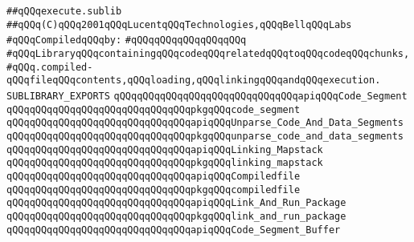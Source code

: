 \label{src/lib/compiler/execution/execute.sublib}
\verb|##qQQqexecute.sublib|\newline
\verb|##qQQq(C)qQQq2001qQQqLucentqQQqTechnologies,qQQqBellqQQqLabs|\newline
\newline
\verb|#qQQqCompiledqQQqby:|\newline
\verb|#qQQqqQQqqQQqqQQqqQQq|\newline
\newline
\newline
\newline
\verb|#qQQqLibraryqQQqcontainingqQQqcodeqQQqrelatedqQQqtoqQQqcodeqQQqchunks,|\newline
\verb|#qQQq.compiled-qQQqfileqQQqcontents,qQQqloading,qQQqlinkingqQQqandqQQqexecution.|\newline
\newline
\newline
\newline
\verb|SUBLIBRARY_EXPORTS|\newline
\newline
\verb|qQQqqQQqqQQqqQQqqQQqqQQqqQQqqQQqapiqQQqCode_Segment|\newline
\verb|qQQqqQQqqQQqqQQqqQQqqQQqqQQqqQQqpkgqQQqcode_segment|\newline
\newline
\verb|qQQqqQQqqQQqqQQqqQQqqQQqqQQqqQQqapiqQQqUnparse_Code_And_Data_Segments|\newline
\verb|qQQqqQQqqQQqqQQqqQQqqQQqqQQqqQQqpkgqQQqunparse_code_and_data_segments|\newline
\newline
\verb|qQQqqQQqqQQqqQQqqQQqqQQqqQQqqQQqapiqQQqLinking_Mapstack|\newline
\verb|qQQqqQQqqQQqqQQqqQQqqQQqqQQqqQQqpkgqQQqlinking_mapstack|\newline
\newline
\verb|qQQqqQQqqQQqqQQqqQQqqQQqqQQqqQQqapiqQQqCompiledfile|\newline
\verb|qQQqqQQqqQQqqQQqqQQqqQQqqQQqqQQqpkgqQQqcompiledfile|\newline
\newline
\verb|qQQqqQQqqQQqqQQqqQQqqQQqqQQqqQQqapiqQQqLink_And_Run_Package|\newline
\verb|qQQqqQQqqQQqqQQqqQQqqQQqqQQqqQQqpkgqQQqlink_and_run_package|\newline
\newline
\verb|qQQqqQQqqQQqqQQqqQQqqQQqqQQqqQQqapiqQQqCode_Segment_Buffer|\newline
